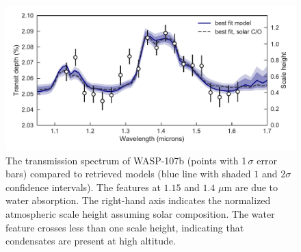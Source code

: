 \documentclass[twocolumn, trackchanges]{aastex61}
\begin{document}
\begin{figure}
\includegraphics[width = \textwidth]{fig2_spectrum.pdf}
\caption{The transmission spectrum of WASP-107b (points with 1\,$\sigma$ error bars) compared to retrieved models (blue line with shaded $1$ and $2\sigma$ confidence intervals). The features at $1.15$ and $1.4$ $\mu$m are due to water absorption. The right-hand axis indicates the normalized atmospheric scale height assuming solar composition. The water feature crosses less than one scale height, indicating that condensates are present at high altitude. } 
\label{fig:spectrum}
\end{figure}
\end{document}
